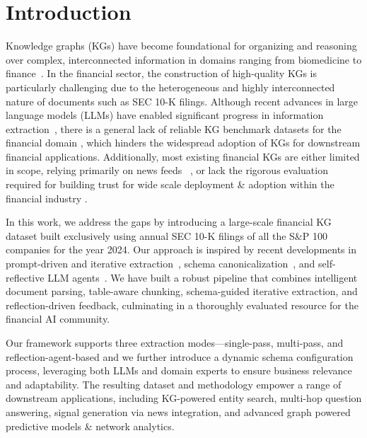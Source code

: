 \section{Introduction}

Knowledge graphs (KGs) have become foundational for organizing and reasoning over complex, interconnected information in domains ranging from biomedicine to finance~\cite{benetka2017financial, elhammadi2020pipeline, li2024findkg}. In the financial sector, the construction of high-quality KGs is particularly challenging due to the heterogeneous and highly interconnected nature of documents such as SEC 10-K filings. Although recent advances in large language models (LLMs) have enabled significant progress in information extraction~\cite{li2023evaluating, zhang2024extract}, there is a general lack of reliable KG benchmark datasets for the financial domain \cite{koncel2023bizbench, reddy2024docfinqa}, which hinders the widespread adoption of KGs for downstream financial applications. Additionally, most existing financial KGs are either limited in scope, relying primarily on news feeds ~\cite{li2024findkg, elhammadi2020pipeline}, or lack the rigorous evaluation required for building trust for wide scale deployment \& adoption within the financial industry \cite{kertkeidkachorn2023finkg}.

In this work, we address the gaps by introducing a large-scale financial KG dataset built exclusively using annual SEC 10-K filings of all the S\&P 100 companies for the year 2024. Our approach is inspired by recent developments in prompt-driven and iterative extraction~\cite{carta2023iterative, jiang2025ras, wei2023chatie}, schema canonicalization~\cite{zhang2024extract}, and self-reflective LLM agents~\cite{li2024findkg}. We have built a robust pipeline that combines intelligent document parsing, table-aware chunking, schema-guided iterative extraction, and reflection-driven feedback, culminating in a thoroughly evaluated resource for the financial AI community.

Our framework supports three extraction modes—single-pass, multi-pass, and reflection-agent-based and we further introduce a dynamic schema configuration process, leveraging both LLMs and domain experts to ensure business relevance and adaptability. The resulting dataset and methodology empower a range of downstream applications, including KG-powered entity search, multi-hop question answering, signal generation via news integration, and advanced graph powered predictive models \& network analytics.

